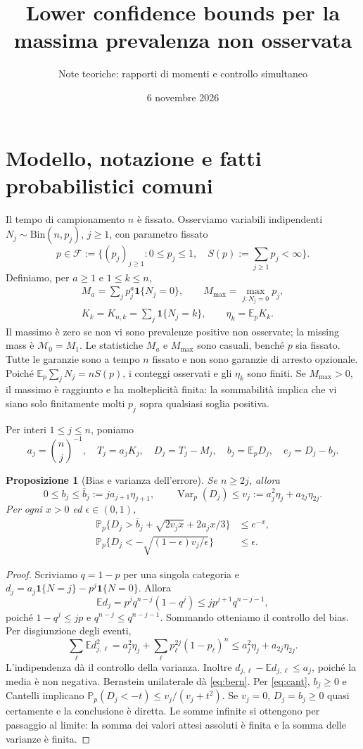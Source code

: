 \documentclass[11pt,a4paper]{article}
\title{Lower confidence bounds per la massima prevalenza non osservata}
\author{Note teoriche: rapporti di momenti e controllo simultaneo}
\date{6 novembre 2026}
\newtheorem{proposition}{Proposizione}[section]
\theoremstyle{remark}\newtheorem{remark}[proposition]{Osservazione}
\newcommand{\E}{\mathbb E_p}
\newcommand{\Pp}{\mathbb P_p}
\newcommand{\ind}{\mathbf1}
\newcommand{\Mmax}{M_{\max}}
\newcommand{\F}{\mathcal F}
\begin{document}
\maketitle
\tableofcontents

\section{Modello, notazione e fatti probabilistici comuni}
Il tempo di campionamento $n$ è fissato. Osserviamo variabili indipendenti
$N_j\sim\mathrm{Bin}(n,p_j)$, $j\ge1$, con parametro fissato
\[
 p\in\F:=\{(p_j)_{j\ge1}:0\le p_j\le1,\quad
 S(p):=\sum_{j\ge1}p_j<\infty\}.
\]
Definiamo, per $a\ge1$ e $1\le k\le n$,
\[
 \begin{gathered}
 M_a=\sum_jp_j^a\ind\{N_j=0\},\qquad \Mmax=\max_{j:N_j=0}p_j,\\
 K_k=K_{n,k}=\sum_j\ind\{N_j=k\},\qquad \eta_k=\E K_k.
 \end{gathered}
\]
Il massimo è zero se non vi sono prevalenze positive non osservate;
la missing mass è $\mathcal M_0=M_1$. Le statistiche $M_a$ e $\Mmax$
sono casuali, benché $p$ sia fissato. Tutte le garanzie sono a tempo $n$
fissato e non sono garanzie di arresto opzionale.
Poiché $\E\sum_jN_j=nS(p)$, i conteggi osservati e gli $\eta_k$ sono finiti.
Se $\Mmax>0$, il massimo è raggiunto e ha molteplicità finita:
la sommabilità implica che vi siano solo finitamente molti $p_j$ sopra
qualsiasi soglia positiva.

Per interi $1\le j\le n$, poniamo
\[
 a_j=\binom nj^{-1},\quad T_j=a_jK_j,\quad D_j=T_j-M_j,
 \quad b_j=\E D_j,\quad e_j=D_j-b_j.
\]
\begin{proposition}[Bias e varianza dell'errore]\label{prop:errors}
Se $n\ge2j$, allora
\[
 0\le b_j\le \overline b_j:=j a_{j+1}\eta_{j+1},\qquad
 \operatorname{Var}_p(D_j)\le v_j:=a_j^2\eta_j+a_{2j}\eta_{2j}.
\]
Per ogni $x>0$ ed $\epsilon\in(0,1)$,
\begin{align}
 \Pp\{D_j>\overline b_j+\sqrt{2v_jx}+2a_jx/3\}&\le e^{-x},\label{eq:bern}\\
 \Pp\{D_j<-\sqrt{(1-\epsilon)v_j/\epsilon}\}&\le\epsilon.\label{eq:cant}
\end{align}
\end{proposition}
\begin{proof}
Scriviamo $q=1-p$ per una singola categoria e
$d_j=a_j\ind\{N=j\}-p^j\ind\{N=0\}$. Allora
\[
 \mathbb E d_j=p^jq^{n-j}(1-q^j)
 \le j p^{j+1}q^{n-j-1},
\]
poiché $1-q^j\le jp$ e $q^{n-j}\le q^{n-j-1}$.
Sommando otteniamo il controllo del bias. Per disgiunzione degli eventi,
\[
 \sum_\ell\mathbb E d_{j,\ell}^2
 =a_j^2\eta_j+\sum_\ell p_\ell^{2j}(1-p_\ell)^n
 \le a_j^2\eta_j+a_{2j}\eta_{2j}.
\]
L'indipendenza dà il controllo della varianza. Inoltre
$d_{j,\ell}-\mathbb E d_{j,\ell}\le a_j$, poiché la media è non negativa.
Bernstein unilaterale dà \eqref{eq:bern}. Per \eqref{eq:cant},
$b_j\ge0$ e Cantelli implicano
$\Pp(D_j<-t)\le v_j/(v_j+t^2)$.
Se $v_j=0$, $D_j=b_j\ge0$ quasi certamente e la conclusione è diretta.
Le somme infinite si ottengono per passaggio al limite: la somma dei valori
attesi assoluti è finita e la somma delle varianze è finita.
\end{proof}
\end{document}
